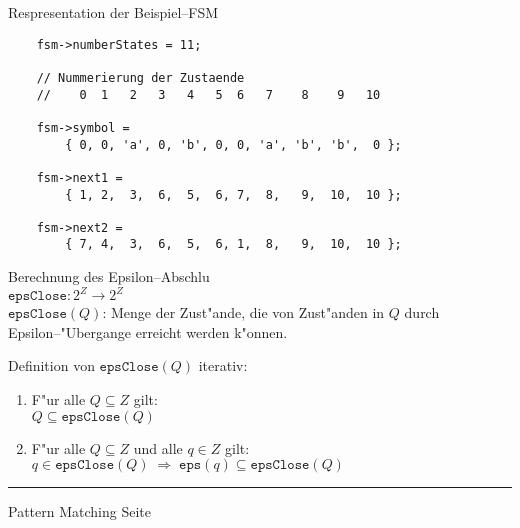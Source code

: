 
\begin{slide}{}
\normalsize

\begin{center}
Respresentation der Beispiel--FSM
\end{center}
\vspace*{0.5cm}

\footnotesize
\begin{verbatim}
    fsm->numberStates = 11;

    // Nummerierung der Zustaende
    //    0  1   2   3   4   5  6   7    8    9   10

    fsm->symbol = 
        { 0, 0, 'a', 0, 'b', 0, 0, 'a', 'b', 'b',  0 };

    fsm->next1 = 
        { 1, 2,  3,  6,  5,  6, 7,  8,   9,  10,  10 };
    
    fsm->next2 = 
        { 7, 4,  3,  6,  5,  6, 1,  8,   9,  10,  10 };
\end{verbatim}
\vspace*{0.5cm}

Berechnung des Epsilon--Abschlu\3 \\[0.3cm]
\hspace*{1.3cm} $\mathtt{epsClose}: 2^Z \rightarrow 2^Z$ \\[0.3cm]
$\mathtt{epsClose}(Q)$: Menge der Zust"ande, die von Zust"anden in $Q$ durch
Epsilon--"Ubergange erreicht werden k"onnen.

Definition von $\mathtt{epsClose}(Q)$ iterativ:
\begin{enumerate}
\item F"ur alle $Q \subseteq Z$ gilt: \\[0.3cm]
      \hspace*{1.3cm} $Q \subseteq \mathtt{epsClose}(Q)$
\item F"ur alle $Q \subseteq Z$ und alle $q \in Z$ gilt: \\[0.3cm]
      $q \in \mathtt{epsClose}(Q) \;\Rightarrow\; \mathtt{eps}(q) \subseteq \mathtt{epsClose}(Q)$
\end{enumerate}

\vspace*{\fill}
\tiny \addtocounter{mypage}{1}
\rule{17cm}{1mm}
Pattern Matching \hspace*{\fill} Seite 
\end{slide}


